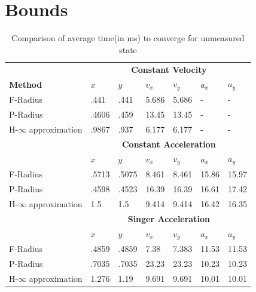\section{Bounds}
\begin{table}[htbp]
\caption{Comparison of average time(in ms) to converge for unmeasured state\\}
	\centering
	\renewcommand{\arraystretch}{1.1}
	\small	
	\begin{tabular}{l l l l l l l}
		\toprule 
		& \multicolumn{6}{c}{\textbf{Constant Velocity}}\\
		\textbf{Method} & \textbf{$x$} & \textbf{$y$} & \textbf{$v_x$} & \textbf{$v_y$} & \textbf{$a_x$} & \textbf{$a_y$}\\ \midrule
		F-Radius & .441 & .441 & 5.686 & 5.686 & - & -\\
		P-Radius & .4606 & .459 & 13.45 & 13.45 & - &	-\\
		H-$\infty$ approximation & .9867 &	.937 &	6.177 & 6.177 & - &-\\
		
		
		& \multicolumn{6}{c}{\textbf{Constant Acceleration}}\\
		 & \textbf{$x$} & \textbf{$y$} & \textbf{$v_x$} & \textbf{$v_y$} & \textbf{$a_x$} & \textbf{$a_y$}\\ \midrule
		F-Radius & .5713 &	.5075 &	8.461	& 8.461 &	15.86 &	15.97\\
		P-Radius & .4598 &	.4523 &	16.39 &	16.39 &	16.61 &	17.42\\
		H-$\infty$ approximation & 1.5 & 1.5 & 9.414 &	9.414 &	16.42 &	16.35\\
		
		
		& \multicolumn{6}{c}{\textbf{Singer Acceleration}}\\
		 & \textbf{$x$} & \textbf{$y$} & \textbf{$v_x$} & \textbf{$v_y$} & \textbf{$a_x$} & \textbf{$a_y$}\\ \midrule
		F-Radius &.4859	& .4859 &	7.38 & 7.383 &	11.53 &	11.53\\
		P-Radius & .7035 &	.7035 &	23.23 &	23.23 &	10.23 &	10.23\\
		H-$\infty$ approximation & 1.276 &	1.19 &	9.691 &	9.691 &	10.01 &	10.01\\
		\bottomrule
	\end{tabular}
	\label{tab:bound}
\end{table}



